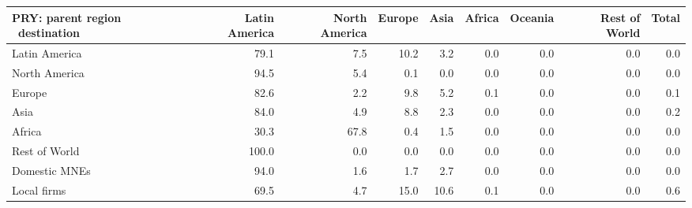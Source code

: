 \begin{tabular}{lrrrrrrrr}
\toprule
PRY: parent region \ destination & Latin America & North America & Europe & Asia & Africa & Oceania & Rest of World & Total \\
\midrule
Latin America & 79.1 & 7.5 & 10.2 & 3.2 & 0.0 & 0.0 & 0.0 & 0.0 \\
North America & 94.5 & 5.4 & 0.1 & 0.0 & 0.0 & 0.0 & 0.0 & 0.0 \\
Europe & 82.6 & 2.2 & 9.8 & 5.2 & 0.1 & 0.0 & 0.0 & 0.1 \\
Asia & 84.0 & 4.9 & 8.8 & 2.3 & 0.0 & 0.0 & 0.0 & 0.2 \\
Africa & 30.3 & 67.8 & 0.4 & 1.5 & 0.0 & 0.0 & 0.0 & 0.0 \\
Rest of World & 100.0 & 0.0 & 0.0 & 0.0 & 0.0 & 0.0 & 0.0 & 0.0 \\
Domestic MNEs & 94.0 & 1.6 & 1.7 & 2.7 & 0.0 & 0.0 & 0.0 & 0.0 \\
Local firms & 69.5 & 4.7 & 15.0 & 10.6 & 0.1 & 0.0 & 0.0 & 0.6 \\
\bottomrule
\end{tabular}
